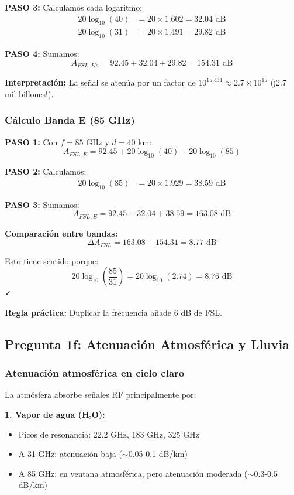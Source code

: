 \documentclass[a4paper,10pt]{article}
\begin{document}
\textbf{PASO 3:} Calculamos cada logaritmo:
\begin{align*}
20\log_{10}(40) &= 20 \times 1.602 = 32.04 \text{ dB}\\
20\log_{10}(31) &= 20 \times 1.491 = 29.82 \text{ dB}
\end{align*}

\textbf{PASO 4:} Sumamos:
$$A_{FSL,Ka} = 92.45 + 32.04 + 29.82 = \boxed{154.31 \text{ dB}}$$

\textbf{Interpretación:} La señal se atenúa por un factor de $10^{15.431} \approx 2.7 \times 10^{15}$ (¡2.7 mil billones!).

\subsubsection{Cálculo Banda E (85 GHz)}

\textbf{PASO 1:} Con $f = 85$ GHz y $d = 40$ km:
$$A_{FSL,E} = 92.45 + 20\log_{10}(40) + 20\log_{10}(85)$$

\textbf{PASO 2:} Calculamos:
\begin{align*}
20\log_{10}(85) &= 20 \times 1.929 = 38.59 \text{ dB}
\end{align*}

\textbf{PASO 3:} Sumamos:
$$A_{FSL,E} = 92.45 + 32.04 + 38.59 = \boxed{163.08 \text{ dB}}$$

\textbf{Comparación entre bandas:}
$$\Delta A_{FSL} = 163.08 - 154.31 = 8.77 \text{ dB}$$

Esto tiene sentido porque:
$$20\log_{10}\left(\frac{85}{31}\right) = 20\log_{10}(2.74) = 8.76 \text{ dB}$$ ✓

\textbf{Regla práctica:} Duplicar la frecuencia añade 6 dB de FSL.

\subsection{Pregunta 1f: Atenuación Atmosférica y Lluvia}

\subsubsection{Atenuación atmosférica en cielo claro}

La atmósfera absorbe señales RF principalmente por:

\textbf{1. Vapor de agua (H₂O):}
\begin{itemize}
    \item Picos de resonancia: 22.2 GHz, 183 GHz, 325 GHz
    \item A 31 GHz: atenuación baja ($\sim$0.05-0.1 dB/km)
    \item A 85 GHz: en ventana atmosférica, pero atenuación moderada ($\sim$0.3-0.5 dB/km)
\end{itemize}
\end{document}
